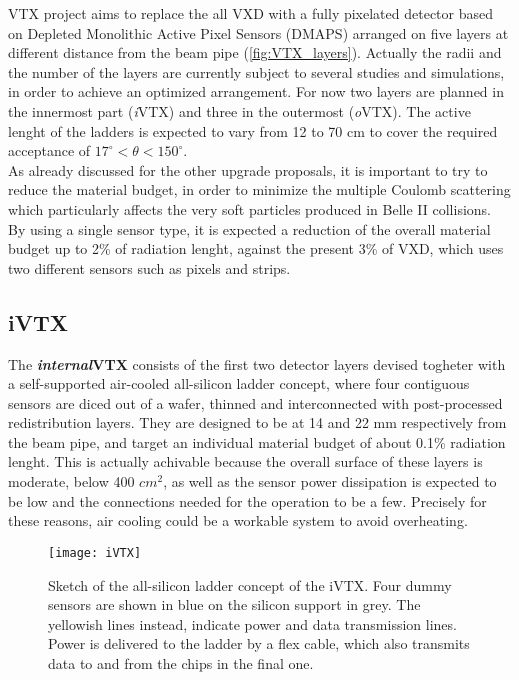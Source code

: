 VTX project aims to replace the all VXD with a fully pixelated detector based on Depleted Monolithic Active Pixel Sensors (DMAPS) arranged on five layers at different distance from the beam pipe (\autoref{fig:VTX_layers}). Actually the radii and the number of the layers are currently subject to several  studies and simulations, in order to achieve an optimized arrangement. 
For now two layers are planned in the innermost part (\textit{i}VTX) and three in the outermost (\textit{o}VTX). The active lenght of the ladders is expected to vary from 12 to 70 cm to cover the required acceptance of $17^{\circ} < \theta < 150^{\circ}$.\\
As already discussed for the other upgrade proposals, it is important to try to reduce the material budget, in order to minimize the multiple Coulomb scattering which particularly affects the very soft particles produced in Belle II collisions. By using a single sensor type, it is expected a reduction of the overall material budget up to 2\% of radiation lenght, against the present 3\% of VXD, which uses two different sensors such as pixels and strips.


\subsection{iVTX}

The \textbf{\textit{internal}VTX} consists of the first two detector layers devised togheter with a self-supported air-cooled all-silicon ladder concept, where four contiguous sensors are diced out of a wafer, thinned and interconnected with post-processed redistribution layers. They are designed to be at 14 and 22 mm respectively from the beam pipe, and target an individual material budget of about 0.1\% radiation lenght. 
This is actually achivable because the overall surface of these layers is moderate, below 400 $cm^{2}$, as well as the sensor power dissipation is expected to be low and the connections needed for the operation to be a few. Precisely for these reasons, air cooling could be a workable system to avoid overheating.


\begin{figure}[h!]
\centering
\texttt{[image: iVTX]}
\caption{Sketch of the all-silicon ladder concept of the iVTX. Four dummy sensors are shown in blue on the silicon support in grey. The yellowish lines instead, indicate power and data transmission lines. Power is delivered to the ladder by a flex cable, which also transmits data to and from the chips in the final one.}
\label{fig:iVTX}
\end{figure}

